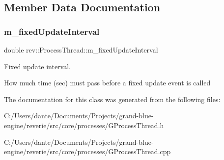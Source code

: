 \subsection{Member Data Documentation}
\mbox{\label{classrev_1_1_process_thread_a618db433e80f313fadea67ca7ffffffc}} 
\subsubsection{\texorpdfstring{m\_fixedUpdateInterval}{m\_fixedUpdateInterval}}
{\footnotesize\ttfamily double rev\+::\+Process\+Thread\+::m\+\_\+fixed\+Update\+Interval\hspace{0.3cm}{\ttfamily [protected]}}



Fixed update interval. 

How much time (sec) must pass before a fixed update event is called 

The documentation for this class was generated from the following files\+:\begin{DoxyCompactItemize}
\item 
C\+:/\+Users/dante/\+Documents/\+Projects/grand-\/blue-\/engine/reverie/src/core/processes/G\+Process\+Thread.\+h\item 
C\+:/\+Users/dante/\+Documents/\+Projects/grand-\/blue-\/engine/reverie/src/core/processes/G\+Process\+Thread.\+cpp\end{DoxyCompactItemize}
